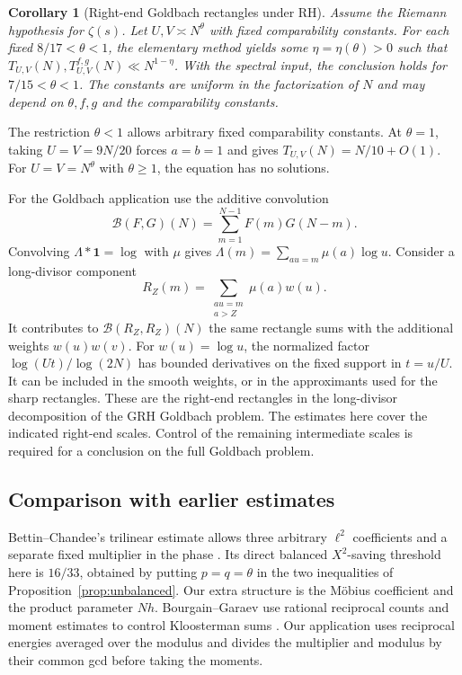\documentclass[11pt]{amsart}
\numberwithin{equation}{section}
\newtheorem{corollary}[theorem]{Corollary}
\theoremstyle{remark}
\begin{document}
\begin{corollary}[Right-end Goldbach rectangles under RH]\label{cor:rectangles}
Assume the Riemann hypothesis for \(\zeta(s)\).
Let \(U,V\asymp N^\theta\) with fixed comparability constants.
For each fixed \(8/17<\theta<1\), the elementary method yields some
\(\eta=\eta(\theta)>0\) such that
\(T_{U,V}(N),T_{U,V}^{f,g}(N)\ll N^{1-\eta}\).
With the spectral input, the conclusion holds for \(7/15<\theta<1\).
The constants are uniform in the factorization of \(N\) and may
depend on \(\theta,f,g\) and the comparability constants.
\end{corollary}

The restriction \(\theta<1\) allows arbitrary fixed comparability
constants. At \(\theta=1\), taking \(U=V=9N/20\) forces \(a=b=1\)
and gives \(T_{U,V}(N)=N/10+O(1)\). For \(U=V=N^\theta\) with
\(\theta\ge1\), the equation has no solutions.

For the Goldbach application use the additive convolution
\[
 \mathcal B(F,G)(N)=\sum_{m=1}^{N-1}F(m)G(N-m).
\]
Convolving \(\Lambda*\mathbf1=\log\) with \(\mu\) gives
\(\Lambda(m)=\sum_{au=m}\mu(a)\log u\).
Consider a long-divisor component
\[
 R_Z(m)=\sum_{\substack{au=m\\a>Z}}\mu(a)w(u).
\]
It contributes to \(\mathcal B(R_Z,R_Z)(N)\) the same rectangle sums
with the additional weights \(w(u)w(v)\). For \(w(u)=\log u\), the
normalized factor \(\log(Ut)/\log(2N)\) has bounded derivatives on
the fixed support in \(t=u/U\). It can be included in the smooth
weights, or in the approximants used for the sharp rectangles.
These are the right-end rectangles in the long-divisor decomposition of the
GRH Goldbach problem. The estimates here cover the indicated right-end
scales. Control of the remaining intermediate scales is required for
a conclusion on the full Goldbach problem.

\subsection{Comparison with earlier estimates}
Bettin--Chandee's trilinear estimate allows three arbitrary
\(\ell^2\) coefficients and a separate fixed multiplier in the
phase \cite[Theorem~1]{BC}. Its direct balanced \(X^2\)-saving
threshold here is \(16/33\), obtained by putting \(p=q=\theta\)
in the two inequalities of Proposition~\ref{prop:unbalanced}.
Our extra structure is the M\"obius coefficient and the product
parameter \(Nh\). Bourgain--Garaev use rational reciprocal counts
and moment estimates to control Kloosterman sums
\cite{BGprime,BGrings}. Our application uses reciprocal energies
averaged over the modulus and divides the multiplier and modulus
by their common gcd before taking the moments.
\end{document}
